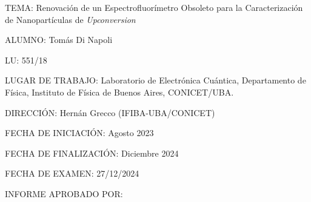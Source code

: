 \documentclass[12pt]{report}
\begin{document}
\newpage

{\large TEMA: Renovación de un Espectrofluorímetro Obsoleto para la Caracterización de Nanopartículas de \textit{Upconversion}}\newline

{\large ALUMNO: Tomás Di Napoli}\newline

{\large LU: 551/18}

{\large LUGAR DE TRABAJO: Laboratorio de Electrónica Cuántica, Departamento de Física, Instituto de Física de Buenos Aires, CONICET/UBA. }\newline

{\large DIRECCIÓN: Hernán Grecco (IFIBA-UBA/CONICET)}\newline

{\large FECHA DE INICIACIÓN: Agosto 2023}\newline

{\large FECHA DE FINALIZACIÓN: Diciembre 2024}\newline

{\large FECHA DE EXAMEN: 27/12/2024 }\newline

{\large INFORME APROBADO POR: }
\end{document}
